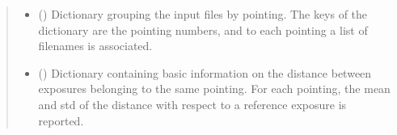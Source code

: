 \documentclass[letterpaper,10pt,english]{sphinxmanual}
\begin{document}
\begin{fulllineitems}
\begin{description}
\end{description}
\begin{quote}\begin{description}
\begin{itemize}
\item {} 
\sphinxAtStartPar
{} () \textendash{} Dictionary grouping the input files by pointing. The keys of the dictionary are the
pointing numbers, and to each pointing a list of filenames is associated.

\item {} 
\sphinxAtStartPar
{} () \textendash{} Dictionary containing basic information on the distance between exposures belonging to
the same pointing. For each pointing, the mean and std of the distance with respect to
a reference exposure is reported.

\end{itemize}

\end{description}\end{quote}

\end{fulllineitems}

\end{document}
